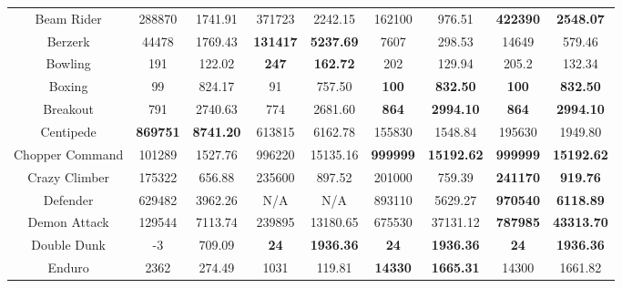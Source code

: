 \documentclass[nohyperref]{article}
\newcommand{\best}[1]{\textbf{#1}}
\theoremstyle{plain}
\begin{document}
\begin{table}[!hb]
\begin{center}
\begin{tabular}{|c |c c| c c| c c |c c|}
 Beam Rider   &288870          &1741.91                   &371723       &2242.15               & 162100            &976.51            &\textbf{422390}   &\textbf{2548.07}\\
 Berzerk      &44478           &1769.43                   &\textbf{131417}       &\textbf{5237.69}               & 7607              &298.53            &14649             &579.46\\
 Bowling      &191             &122.02                    &\textbf{247}           &\textbf{162.72}                & 202               &129.94           &205.2             &132.34\\
 Boxing       &99              &824.17                    &91                     &757.50                         & \best{100}        &\best{832.50}    &\textbf{100}      &\textbf{832.50}        \\
 Breakout     &791             &2740.63                   &774                    &2681.60                        & \best{864}        &\best{2994.10}   &\textbf{864}      &\textbf{2994.10}        \\
 Centipede    &\textbf{869751} &\textbf{8741.20}          &613815                &6162.78               & 155830            &1548.84                    &195630            &1949.80\\
 Chopper Command &101289       &1527.76            &996220                &15135.16                       & \best{999999}     &\best{15192.62}          &\textbf{999999}   &\textbf{15192.62}\\
 Crazy Climber   &175322       &656.88             &235600       &897.52                & 201000            &759.39                   &\textbf{241170}	            &\textbf{919.76}\\
 Defender        &629482       &3962.26            &N/A                    &N/A                            & 893110     &5629.27                        &\textbf{970540}   &\textbf{6118.89}\\
 Demon Attack    &129544       &7113.74            &239895                 &13180.65                       & 675530     &37131.12         &\textbf{787985}                     &\textbf{43313.70}\\
 Double Dunk     &-3           &709.09             &\textbf{24}                     &\textbf{1936.36}                        & \best{24}         &\best{1936.36}          &\textbf{24}       &\textbf{1936.36}\\
 Enduro          &2362         &274.49             &1031                   &119.81                         & \best{14330}      &\best{1665.31}          &14300             &1661.82\\

\end{tabular}
\end{center}
\end{table}
\end{document}

